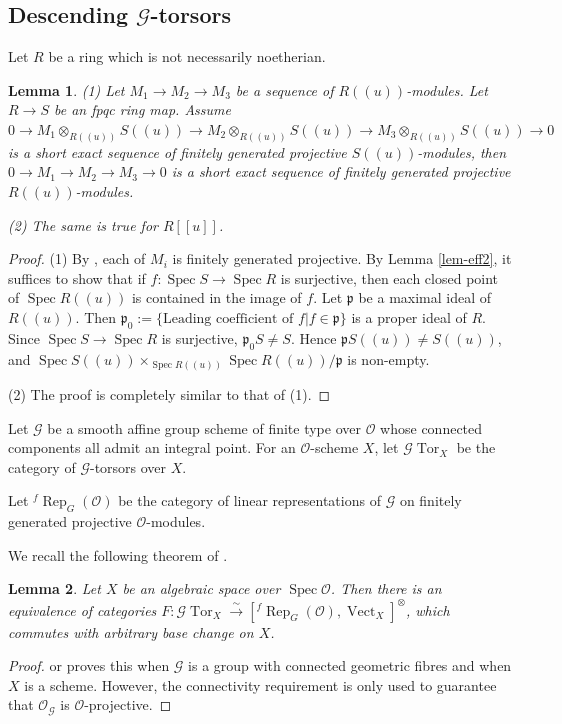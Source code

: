 \documentclass[11pt]{amsart}
\newtheorem{lem}{Lemma}
\numberwithin{thm}{section}
\numberwithin{lem}{section}
\numberwithin{cor}{section}
\numberwithin{prop}{section}
\numberwithin{exam}{section}
\numberwithin{dfn}{section}
\newcommand{\frepg}{^f\operatorname{Rep}_G}
\newcommand{\gtor}{\cG\operatorname{Tor}}
\newcommand{\vect}{\operatorname{Vect}}
\newcommand{\spec}{\operatorname{Spec}}
\newcommand{\mysection}{\subsection}
\newcommand{\cO}{\mathcal{O}}
\newcommand{\fp}{\mathfrak{p}}
\newcommand{\cG}{\mathcal{G}}
\begin{document}
\begin{appendices}
\mysection{Descending $\cG$-torsors}
\label{ssec:descent-torsor}

Let $R$ be a ring which is not necessarily noetherian.

\begin{lem}
\label{tan-lem1}
(1) Let $M_1\to M_2\to M_3$ be a sequence of $R(\!(u)\!)$-modules.
Let $R\to S$ be an fpqc ring map.
Assume $0\to M_1\otimes_{R(\!(u)\!)}S(\!(u)\!)\to M_2\otimes_{R(\!(u)\!)}S(\!(u)\!)\to
M_3\otimes_{R(\!(u)\!)}S(\!(u)\!)\to 0$ is a short exact sequence
of finitely generated projective $S(\!(u)\!)$-modules,
then $0\to M_1\to M_2\to M_3\to 0$ is a short exact sequence
of finitely generated projective $R(\!(u)\!)$-modules.

(2) The same is true for $R[\![u]\!]$.
\end{lem}

\begin{proof}
(1)
By \cite[Theorem 5.1.18]{EG21}, each of $M_i$ is finitely generated projective.
By Lemma \ref{lem-eff2}, it suffices to show
that if $f:\spec S\to \spec R$ is surjective,
then each closed point of $\spec R(\!(u)\!)$ is contained in the image of $f$.
Let $\fp$ be a maximal ideal of $R(\!(u)\!)$.
Then $\fp_0 := \{\text{Leading coefficient of $f$}|f\in \fp\}$
is a proper ideal of $R$.
Since $\spec S\to \spec R$ is surjective, $\fp_0S\ne S$.
Hence $\fp S(\!(u)\!)\ne S(\!(u)\!)$, and
$\spec S(\!(u)\!)\times_{\spec R(\!(u)\!)}\spec R(\!(u)\!)/\fp$
is non-empty.

(2) The proof is completely similar to that of (1).
\end{proof}

Let $\cG$ be a smooth affine group scheme of finite type over $\cO$
whose connected components all admit an integral point.
For an $\cO$-scheme $X$,
let $\gtor_X$ be the category of $\cG$-torsors over $X$.

Let $\frepg(\cO)$ be the category of 
linear representations of $\cG$ on finitely generated projective $\cO$-modules.

We recall the following theorem of \cite[Theorem 2.1.1]{Lev15}.

\begin{lem}
\label{tan-thm0}
Let $X$ be an algebraic space over $\spec\cO$.
Then there is an equivalence of categories
$F:\gtor_X \xrightarrow{\sim} [\frepg(\cO), \vect_X]^\otimes$,
which commutes with arbitrary base change on $X$.
\end{lem}

\begin{proof}
\cite[2.1.1]{Lev15} or \cite[2.5.2]{Lev13} proves this when
$\cG$ is a group with connected geometric fibres and when $X$ is a scheme.
However, the connectivity requirement is only used to guarantee that
$\cO_{\cG}$ is $\cO$-projective.


\end{proof}
\end{appendices}
\end{document}
